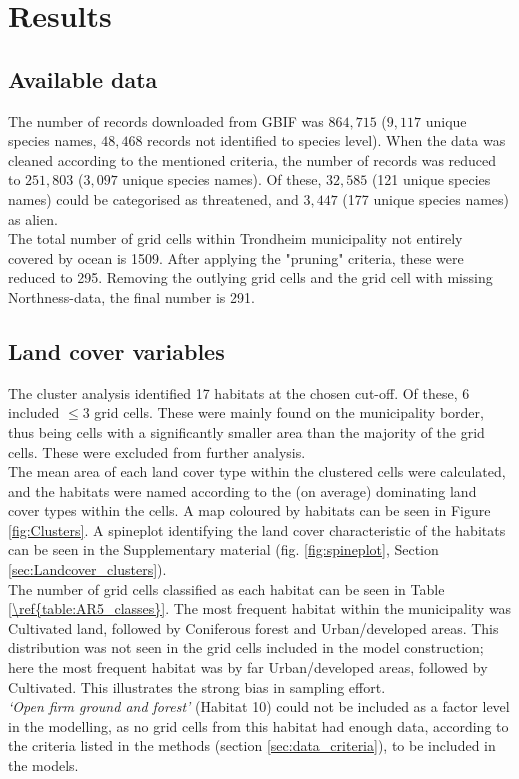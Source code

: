 \documentclass{article}
\begin{document}
\section{Results}
\subsection{Available data}
The number of records downloaded from GBIF was $864,715$ ($9,117$ unique species names, $48,468$ records not identified to species level). 
When the data was cleaned according to the mentioned criteria, the number of records was reduced to $251,803$ ($3,097$ unique species names). Of these, $32,585$ (121 unique species names) could be categorised as threatened, and $3,447$ (177 unique species names) as alien. \\
The total number of grid cells within Trondheim municipality not entirely covered by ocean is 1509. After applying the "pruning" criteria, these were reduced to 295. Removing the outlying grid cells and the grid cell with missing Northness-data, the final number is 291.

\subsection{Land cover variables}
The cluster analysis identified 17 habitats at the chosen cut-off. Of these, 6 included $\leq3$ grid cells. These were mainly found on the municipality border, thus being cells with a significantly smaller area than the majority of the grid cells. These were excluded from further analysis.\\
The mean area of each land cover type within the clustered cells were calculated, and the habitats were named according to the (on average) dominating land cover types within the cells. A map coloured by habitats can be seen in Figure \ref{fig:Clusters}. A spineplot identifying the land cover characteristic of the habitats can be seen in the Supplementary material (fig. \ref{fig:spineplot}, Section  \ref{sec:Landcover_clusters}).\\
The number of grid cells classified as each habitat can be seen in Table \ref{\ref{table:AR5_classes}}. The most frequent habitat within the municipality was Cultivated land, followed by Coniferous forest and Urban/developed areas. This distribution was not seen in the grid cells included in the model construction; here the most frequent habitat was by far Urban/developed areas, followed by Cultivated. This illustrates the strong bias in sampling effort.\\
\textit{`Open firm ground and forest'} (Habitat 10) could not be included as a factor level in the modelling, as no grid cells from this habitat had enough data, according to the criteria listed in the methods (section \ref{sec:data_criteria}), to be included in the models.\\
\end{document}

